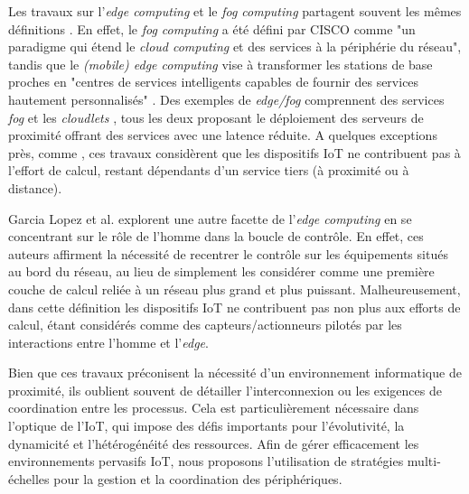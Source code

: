 Les travaux sur l'\textit{edge computing} et le \textit{fog computing} partagent souvent les mêmes définitions \cite{Vermesan}. En effet, le \textit{fog computing} a été défini par CISCO \cite{FogCISCO} comme "un paradigme qui étend le \textit{cloud computing} et des services à la périphérie du réseau", tandis que le \textit{(mobile) edge computing} vise à transformer les stations de base proches en "centres de services intelligents capables de fournir des services hautement personnalisés" \cite{Vermesan}. Des exemples de \textit{edge/fog} comprennent des services \textit{fog} \cite{Bonomi2012} et les \textit{cloudlets} \cite{Satyanarayanan09}, tous les deux proposant le déploiement des serveurs de proximité offrant des services avec une latence réduite. A quelques exceptions près, comme \cite{Dey2013}, ces travaux considèrent que les dispositifs IoT ne contribuent pas à l'effort de calcul, restant dépendants d'un service tiers (à proximité ou à distance).

Garcia Lopez et al. \cite{Lopez2015} explorent une autre facette de l'\textit{edge computing} en se concentrant sur le rôle de l'homme dans la boucle de contrôle. En effet, ces auteurs affirment la nécessité de recentrer le contrôle sur les équipements situés au bord du réseau, au lieu de simplement les considérer comme une première couche de calcul reliée à un réseau plus grand et plus puissant. %
Malheureusement, dans cette définition les dispositifs IoT ne contribuent pas non plus aux efforts de calcul, étant considérés comme des capteurs/actionneurs pilotés par les interactions entre l'homme et l'\textit{edge}.

Bien que ces travaux préconisent la nécessité d'un environnement informatique de proximité, ils oublient souvent de détailler l'interconnexion ou les exigences de coordination entre les processus. Cela est particulièrement nécessaire dans l'optique de l'IoT, qui impose des défis importants pour l'évolutivité, la dynamicité et l'hétérogénéité des ressources. Afin de gérer efficacement les environnements pervasifs IoT, nous proposons l'utilisation de stratégies multi-échelles pour la gestion et la coordination des périphériques.

